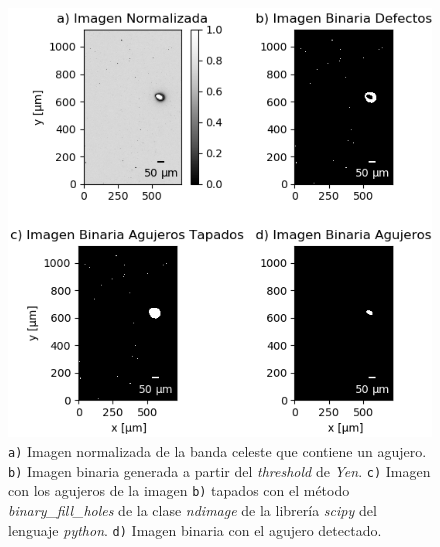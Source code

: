 \begin{figure}[H]
\centering
\includegraphics[scale=1.1]{Figs/defectosZEISS/algor_defecs.png}
\caption{\texttt{a)} Imagen normalizada de la banda celeste que contiene un agujero.  \texttt{b)} Imagen binaria generada a partir del \textit{threshold} de \textit{Yen}. \texttt{c)} Imagen con los agujeros de la imagen \texttt{b)} tapados con el método \textit{binary\_fill\_holes} de la clase \textit{ndimage} de la librería \textit{scipy} del lenguaje \textit{python}. \texttt{d)} Imagen binaria con el agujero detectado.}
\label{fig:flujoalgo}
\end{figure} 

